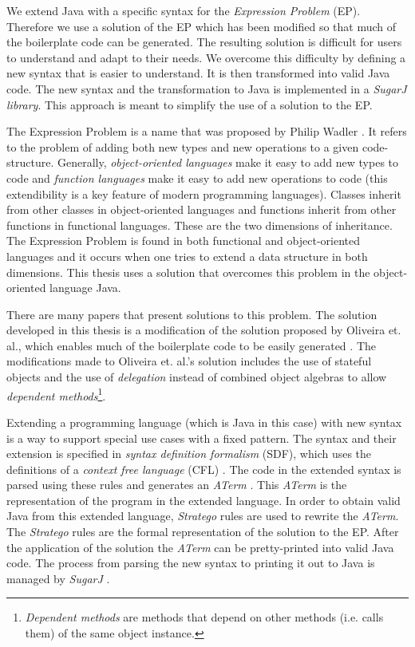 \documentclass{report}
\begin{document}
We extend Java with a specific syntax for the \emph{Expression Problem} (EP). Therefore we use a solution of the EP which has been modified so that much of the boilerplate code can be generated. The resulting solution is difficult for users to understand and adapt to their needs. We overcome this difficulty by defining a new syntax that is easier to understand. It is then transformed into valid Java code. The new syntax and the transformation to Java is implemented in a \emph{SugarJ library}. This approach is meant to simplify the use of a solution to the EP.

The Expression Problem is a name that was proposed by Philip Wadler \cite{Wadler-Expression-1998}. It refers to the problem of adding both new types and new operations to a given code-structure. Generally, \emph{object-oriented languages} make it easy to add new types to code and \emph{function languages} make it easy to add new operations to code (this extendibility is a key feature of modern programming languages). Classes inherit from other classes in object-oriented languages and functions inherit from other functions in functional languages. These are the two dimensions of inheritance. The Expression Problem is found in both functional and object-oriented languages and it occurs when one tries to extend a data structure in both dimensions. This thesis uses a solution that overcomes this problem in the object-oriented language Java.

There are many papers that present solutions to this problem. The solution developed in this thesis is a modification of the solution proposed by Oliveira et. al., which enables much of the boilerplate code to be  easily generated \cite{Oliv-Extensibility-2012}. The modifications made to Oliveira et. al.'s solution includes the use of stateful objects and the use of \emph{delegation} instead of combined object algebras to allow \emph{dependent methods}\footnote{\emph{Dependent methods} are methods that depend on other methods (i.e. calls them) of the same object instance.}.

Extending a programming language (which is Java in this case) with new syntax is a way to support special use cases with a fixed pattern. The syntax and their extension is specified in \emph{syntax definition formalism} (SDF), which uses the definitions of a \emph{context free language} (CFL) \cite{Heering-SDF-1989}. The code in the extended syntax is parsed using these rules and generates an \emph{ATerm} \cite{Brand-ATerms-2000}. This \emph{ATerm} is the representation of the program in the extended language. In order to obtain valid Java from this extended language, \emph{Stratego} rules are used to rewrite the \emph{ATerm}. The \emph{Stratego} rules are the formal representation of the solution to the EP. After the application of the solution the \emph{ATerm} can be pretty-printed into valid Java code. The process from parsing the new syntax to printing it out to Java is managed by \emph{SugarJ} \cite{Erdweg-SugarJ-2011}.
\end{document}
